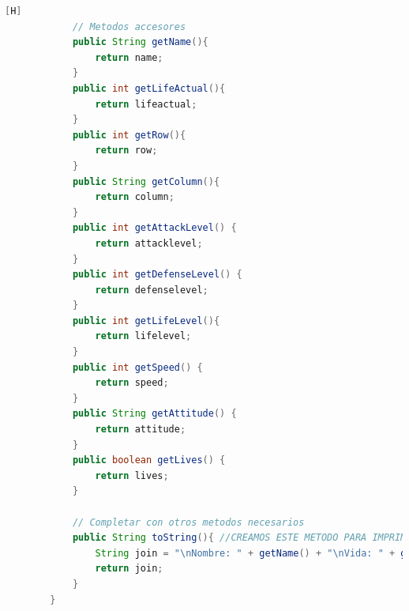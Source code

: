 \documentclass{article}
\begin{document}
\begin{lstlisting}[language=java,caption={Las lineas de codigos del metodo creado:}][H]
			// Metodos accesores
			public String getName(){
				return name;
			}
			public int getLifeActual(){
				return lifeactual;
			}
			public int getRow(){
				return row;
			}
			public String getColumn(){
				return column;
			}
			public int getAttackLevel() {
				return attacklevel;
			}
			public int getDefenseLevel() {
				return defenselevel;
			}
			public int getLifeLevel(){
				return lifelevel;
			}
			public int getSpeed() {
				return speed;
			}
			public String getAttitude() {
				return attitude;
			}
			public boolean getLives() {
				return lives;
			}
		
			// Completar con otros metodos necesarios
			public String toString(){ //CREAMOS ESTE METODO PARA IMPRIMIR LOS DATOS DEl OBJETO
				String join = "\nNombre: " + getName() + "\nVida: " + getLifeActual() + "\nFila: " + getRow() + "\nColumna: " + getColumn() + "\nNivel de ataque: " + getAttackLevel() + "\nNivel de Defensa: " + getDefenseLevel() + "\nNivel de vida: " + getLifeLevel() + "\nVelocidad: " + getSpeed() + "\nActitud: " + getAttitude() + "\nEstado: " + getLives(); //Agregamos un espaciador para poder separar
				return join;
			}
		}		

	\end{lstlisting}
\end{document}

